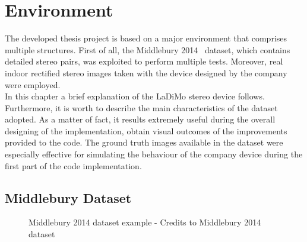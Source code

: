 \chapter{Environment}
\label{chapter:environment}

The developed thesis project is based on a major environment that comprises multiple structures.
First of all, the Middlebury 2014~\cite{Scharstein2014} dataset, which contains detailed stereo pairs, was exploited to perform multiple tests.
Moreover, real indoor rectified stereo images taken with the device designed by the company were employed.\\
In this chapter a brief explanation of the LaDiMo stereo device follows.
Furthermore, it is worth to describe the main characteristics of the dataset adopted.
As a matter of fact, it results extremely useful during the overall designing of the implementation, obtain visual outcomes of the improvements provided to the code.
The ground truth images available in the dataset were especially effective for simulating the behaviour of the company device during the first part of the code implementation.

\section{Middlebury Dataset}
\label{section:middle-dataset}

\begin{figure}[t]
	\centering
\caption{Middlebury 2014 dataset example - Credits to Middlebury 2014 dataset~\cite{Scharstein2014}}
\label{fig:dataset-example}
\end{figure}

